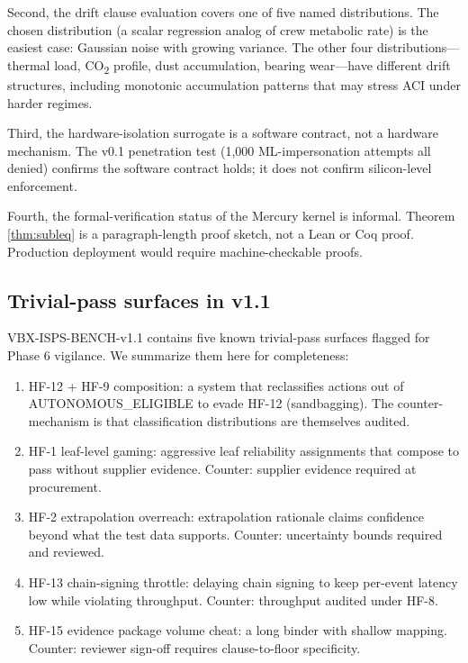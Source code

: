 \documentclass[conference]{IEEEtran}
\theoremstyle{definition}
\theoremstyle{plain}
\theoremstyle{remark}
\begin{document}
Second, the drift clause evaluation covers one of five named distributions. The chosen distribution (a scalar regression analog of crew metabolic rate) is the easiest case: Gaussian noise with growing variance. The other four distributions---thermal load, CO\textsubscript{2} profile, dust accumulation, bearing wear---have different drift structures, including monotonic accumulation patterns that may stress ACI under harder regimes.

Third, the hardware-isolation surrogate is a software contract, not a hardware mechanism. The v0.1 penetration test (1{,}000 ML-impersonation attempts all denied) confirms the software contract holds; it does not confirm silicon-level enforcement.

Fourth, the formal-verification status of the Mercury kernel is informal. Theorem \ref{thm:subleq} is a paragraph-length proof sketch, not a Lean or Coq proof. Production deployment would require machine-checkable proofs.

\subsection{Trivial-pass surfaces in v1.1}

VBX-ISPS-BENCH-v1.1 contains five known trivial-pass surfaces flagged for Phase 6 vigilance. We summarize them here for completeness:

\begin{enumerate}
\item HF-12 + HF-9 composition: a system that reclassifies actions out of AUTONOMOUS\_ELIGIBLE to evade HF-12 (sandbagging). The counter-mechanism is that classification distributions are themselves audited.
\item HF-1 leaf-level gaming: aggressive leaf reliability assignments that compose to pass without supplier evidence. Counter: supplier evidence required at procurement.
\item HF-2 extrapolation overreach: extrapolation rationale claims confidence beyond what the test data supports. Counter: uncertainty bounds required and reviewed.
\item HF-13 chain-signing throttle: delaying chain signing to keep per-event latency low while violating throughput. Counter: throughput audited under HF-8.
\item HF-15 evidence package volume cheat: a long binder with shallow mapping. Counter: reviewer sign-off requires clause-to-floor specificity.
\end{enumerate}
\end{document}
